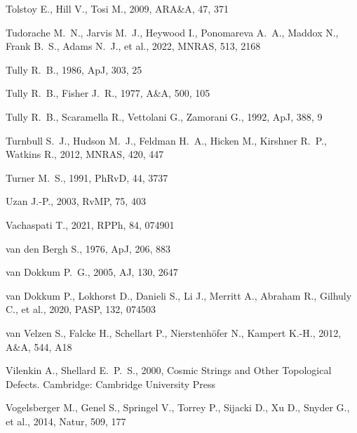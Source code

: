 \documentclass[fleqn,12pt]{article}
\begin{document}
\begin{thebibliography}{}
 Tolstoy E., Hill V., Tosi M., 2009, ARA\&A, 47, 371

 Tudorache M.~N., Jarvis M.~J., Heywood I., Ponomareva A.~A., Maddox N., Frank B.~S., Adams N.~J., et al., 2022, MNRAS, 513, 2168

 Tully R.~B., 1986, ApJ, 303, 25

 Tully R.~B., Fisher J.~R., 1977, A\&A, 500, 105

 Tully R.~B., Scaramella R., Vettolani G., Zamorani G., 1992, ApJ, 388, 9

 Turnbull S.~J., Hudson M.~J., Feldman H.~A., Hicken M., Kirshner R.~P., Watkins R., 2012, MNRAS, 420, 447

 Turner M.~S., 1991, PhRvD, 44, 3737

 Uzan J.-P., 2003, RvMP, 75, 403

 Vachaspati T., 2021, RPPh, 84, 074901

 van den Bergh S., 1976, ApJ, 206, 883

 van Dokkum P.~G., 2005, AJ, 130, 2647

 van Dokkum P., Lokhorst D., Danieli S., Li J., Merritt A., Abraham R., Gilhuly C., et al., 2020, PASP, 132, 074503

 van Velzen S., Falcke H., Schellart P., Nierstenh{\"o}fer N., Kampert K.-H., 2012, A\&A, 544, A18

 Vilenkin A., Shellard E.~P.~S., 2000, Cosmic Strings and Other Topological Defects. Cambridge: Cambridge University Press

 Vogelsberger M., Genel S., Springel V., Torrey P., Sijacki D., Xu D., Snyder G., et al., 2014, Natur, 509, 177


\end{thebibliography}
\end{document}
